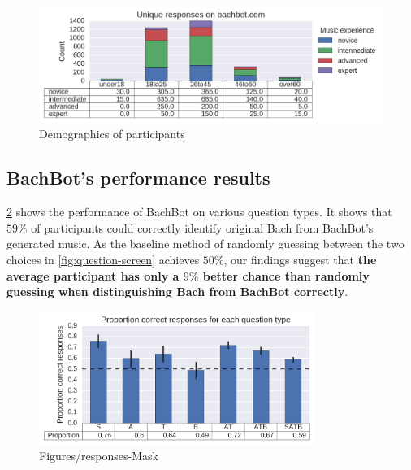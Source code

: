 \documentclass[dissertation.tex]{subfiles}
\begin{document}
\begin{figure}[htpb]
  \centering
  \includegraphics[width=\textwidth]{Figures/responses-ageGroup-musicExperience.png}
  \caption{Demographics of participants}
  \label{fig:user-demographics}
\end{figure}

\subsection{BachBot's performance results}


\cref{fig:responses-mask} shows the performance of BachBot on various question
types. It shows that $59\%$ of participants could correctly
identify original Bach from BachBot's generated music. As the baseline method
of randomly guessing between the two choices in \cref{fig:question-screen}
achieves $50\%$, our findings suggest that {\bf the average participant has only a
$9\%$ better chance than randomly guessing when
distinguishing Bach from BachBot correctly}.

\begin{figure}[htpb]
  \centering
  \includegraphics[width=0.8\textwidth]{Figures/responses-mask.png}
  \caption{Figures/responses-Mask}
  \label{fig:responses-mask}
\end{figure}
\end{document}
